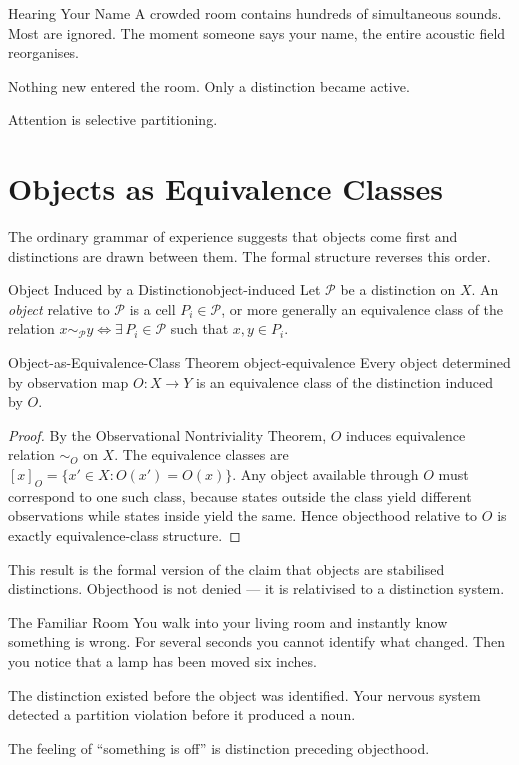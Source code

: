 \documentclass[12pt,twoside,openright]{book}
\newcommand{\partition}{\mathcal{P}}
\begin{document}
\begin{distinctionaside}{Hearing Your Name}
A crowded room contains hundreds of simultaneous sounds.
Most are ignored. The moment someone says your name, the
entire acoustic field reorganises.

Nothing new entered the room. Only a distinction became
active.

Attention is selective partitioning.
\end{distinctionaside}

\section{Objects as Equivalence Classes}
\label{sec:ch1-objects}

The ordinary grammar of experience suggests that objects
come first and distinctions are drawn between them. The
formal structure reverses this order.

\begin{definition}{Object Induced by a Distinction}{object-induced}
  Let $\partition$ be a distinction on $X$.
  An \emph{object} relative to $\partition$ is a cell
  $P_i \in \partition$, or more generally an equivalence
  class of the relation
  $x \sim_\partition y \iff \exists\, P_i \in \partition$
  such that $x, y \in P_i$.
\end{definition}

\begin{theorem}{Object-as-Equivalence-Class Theorem}%
  {object-equivalence}
  Every object determined by observation map $O: X \to Y$
  is an equivalence class of the distinction induced by $O$.
\end{theorem}

\begin{proof}
  By the Observational Nontriviality Theorem, $O$ induces
  equivalence relation $\sim_O$ on $X$. The equivalence
  classes are $[x]_O = \{x' \in X : O(x') = O(x)\}$.
  Any object available through $O$ must correspond to one
  such class, because states outside the class yield
  different observations while states inside yield the
  same. Hence objecthood relative to $O$ is exactly
  equivalence-class structure.
\end{proof}

This result is the formal version of the claim that
objects are stabilised distinctions. Objecthood is not
denied — it is relativised to a distinction system.

\begin{distinctionaside}{The Familiar Room}
You walk into your living room and instantly know something
is wrong. For several seconds you cannot identify what
changed. Then you notice that a lamp has been moved six
inches.

The distinction existed before the object was identified.
Your nervous system detected a partition violation before it
produced a noun.

The feeling of ``something is off'' is distinction preceding
objecthood.
\end{distinctionaside}
\end{document}
